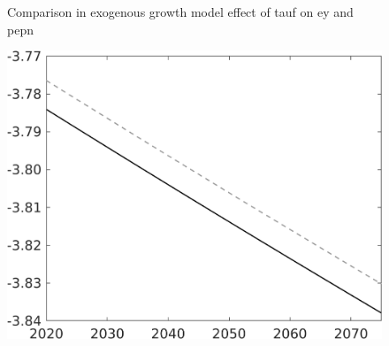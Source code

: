 \documentclass[12pt]{article}
\begin{document}
\begin{figure}{Comparison in exogenous growth model effect of tauf on ey and pepn }
\begin{minipage}[]{0.32\textwidth}
		\end{minipage}
	\begin{minipage}[]{0.32\textwidth}
	\includegraphics[width=1\textwidth]{../../codding_model/own_basedOnFried/optimalPol_010922_revision/figures/all_13Sept22/PerdifNoTauf_Equlab_regime0_CompTaul_pn_spillover0_nsk0_xgr1_knspil1_sep0_LFlimit0_emsbase0_countec0_GovRev0_etaa0.79_lgd0.png}
\end{minipage}
	\end{figure}
\end{document}
